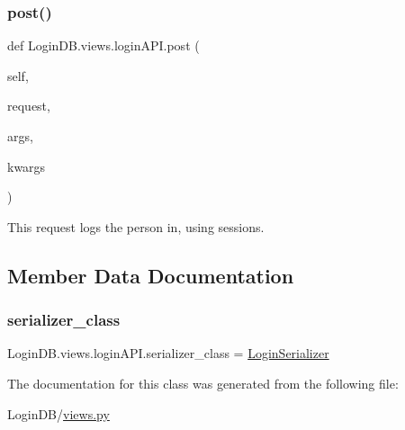 \subsubsection{\texorpdfstring{post()}{post()}}
{\footnotesize\ttfamily def Login\+D\+B.\+views.\+login\+A\+P\+I.\+post (\begin{DoxyParamCaption}\item[{}]{self,  }\item[{}]{request,  }\item[{}]{args,  }\item[{}]{kwargs }\end{DoxyParamCaption})}



This request logs the person in, using sessions. 



\subsection{Member Data Documentation}
\mbox{\label{class_login_d_b_1_1views_1_1login_a_p_i_a8aae9e202c7bb594023abc92454c4ca5}} 
\subsubsection{\texorpdfstring{serializer\+\_\+class}{serializer\_class}}
{\footnotesize\ttfamily Login\+D\+B.\+views.\+login\+A\+P\+I.\+serializer\+\_\+class = \hyperlink{class_login_d_b_1_1serializers_1_1_login_serializer}{Login\+Serializer}\hspace{0.3cm}{\ttfamily [static]}}



The documentation for this class was generated from the following file\+:\begin{DoxyCompactItemize}
\item 
Login\+D\+B/\hyperlink{views_8py}{views.\+py}\end{DoxyCompactItemize}

